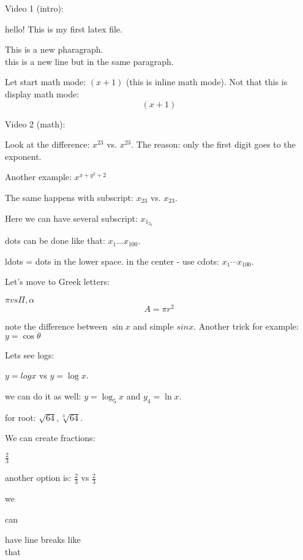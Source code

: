 \documentclass[11pt]{article}
\begin{document}
Video 1 (intro):

hello!
This is my first latex file.

This is a new pharagraph.\\this is a new line but in the same paragraph.

Let start math mode: $(x+1)$ (this is inline math mode).
Not that this is display math mode: $$(x+1)$$

Video 2 (math):

Look at the difference: $x^23$ vs. $x^{23}$. The reason: only the first digit goes to the exponent.

Another example: $x^{x+y^2+2}$

The same happens with subscript: $x_23$ vs. $x_{23}$.

Here we can have several subscript: $x_{1_{2_3}}$

dots can be done like that: $x_1 \ldots x_{100}$.

ldots = dots in the lower space. in the center - use cdots: $x_1 \cdots x_{100}$.

Let's move to Greek letters:

$\pi  vs  \Pi, \alpha$
$$ A = \pi r^2$$

note the difference between $\sin x$ and simple $sinx$.
Another trick for example: $y=\cos \theta$

Lets see logs:

$y =log x$ vs $y=\log x$.

we can do it as well: $y = \log_5 x$ and $y_4 = \ln x$.

for root: 
$\sqrt{64}, \sqrt[3]{64}$.

We can create fractions:

$\frac{2}{3}$

another option is: $\displaystyle \frac{2}{3}$ vs $\frac{2}{3}$

we

can

have line breaks like \\[16pt] that
\end{document}
